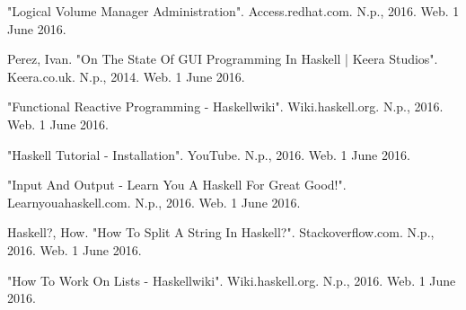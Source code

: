 \documentclass{aes2e}
\begin{document}
\begin{thebibliography}{99}
  "Logical Volume Manager Administration". Access.redhat.com. N.p., 2016. Web. 1 June 2016.
  
 Perez, Ivan. "On The State Of GUI Programming In Haskell | Keera Studios". Keera.co.uk. N.p., 2014. Web. 1 June 2016.

"Functional Reactive Programming - Haskellwiki". Wiki.haskell.org. N.p., 2016. Web. 1 June 2016.

"Haskell Tutorial - Installation". YouTube. N.p., 2016. Web. 1 June 2016.

"Input And Output - Learn You A Haskell For Great Good!". Learnyouahaskell.com. N.p., 2016. Web. 1 June 2016.

Haskell?, How. "How To Split A String In Haskell?". Stackoverflow.com. N.p., 2016. Web. 1 June 2016.

"How To Work On Lists - Haskellwiki". Wiki.haskell.org. N.p., 2016. Web. 1 June 2016.
\end{thebibliography}
\end{document}

